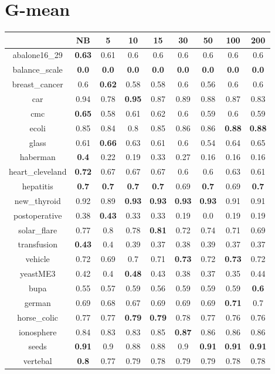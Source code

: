 \documentclass{article}%
\begin{document}
%
\section*{G{-}mean}%
\begin{tabular}{c|cccccccc}%
\hline%
&NB&5&10&15&30&50&100&200\\%
\hline%
abalone16\_29&\textbf{0.63}&0.61&0.6&0.6&0.6&0.6&0.6&0.6\\%
\hline%
balance\_scale&\textbf{0.0}&\textbf{0.0}&\textbf{0.0}&\textbf{0.0}&\textbf{0.0}&\textbf{0.0}&\textbf{0.0}&\textbf{0.0}\\%
\hline%
breast\_cancer&0.6&\textbf{0.62}&0.58&0.58&0.6&0.56&0.6&0.6\\%
\hline%
car&0.94&0.78&\textbf{0.95}&0.87&0.89&0.88&0.87&0.83\\%
\hline%
cmc&\textbf{0.65}&0.58&0.61&0.62&0.6&0.59&0.6&0.59\\%
\hline%
ecoli&0.85&0.84&0.8&0.85&0.86&0.86&\textbf{0.88}&\textbf{0.88}\\%
\hline%
glass&0.61&\textbf{0.66}&0.63&0.61&0.6&0.54&0.64&0.65\\%
\hline%
haberman&\textbf{0.4}&0.22&0.19&0.33&0.27&0.16&0.16&0.16\\%
\hline%
heart\_cleveland&\textbf{0.72}&0.67&0.67&0.67&0.6&0.6&0.63&0.61\\%
\hline%
hepatitis&\textbf{0.7}&\textbf{0.7}&\textbf{0.7}&\textbf{0.7}&0.69&\textbf{0.7}&0.69&\textbf{0.7}\\%
\hline%
new\_thyroid&0.92&0.89&\textbf{0.93}&\textbf{0.93}&\textbf{0.93}&\textbf{0.93}&0.91&0.91\\%
\hline%
postoperative&0.38&\textbf{0.43}&0.33&0.33&0.19&0.0&0.19&0.19\\%
\hline%
solar\_flare&0.77&0.8&0.78&\textbf{0.81}&0.72&0.74&0.71&0.69\\%
\hline%
transfusion&\textbf{0.43}&0.4&0.39&0.37&0.38&0.39&0.37&0.37\\%
\hline%
vehicle&0.72&0.69&0.7&0.71&\textbf{0.73}&0.72&\textbf{0.73}&0.72\\%
\hline%
yeastME3&0.42&0.4&\textbf{0.48}&0.43&0.38&0.37&0.35&0.44\\%
\hline%
bupa&0.55&0.57&0.59&0.56&0.59&0.59&0.59&\textbf{0.6}\\%
\hline%
german&0.69&0.68&0.67&0.69&0.69&0.69&\textbf{0.71}&0.7\\%
\hline%
horse\_colic&0.77&0.77&\textbf{0.79}&\textbf{0.79}&0.78&0.77&0.76&0.76\\%
\hline%
ionosphere&0.84&0.83&0.83&0.85&\textbf{0.87}&0.86&0.86&0.86\\%
\hline%
seeds&\textbf{0.91}&0.9&0.88&0.88&0.9&\textbf{0.91}&\textbf{0.91}&\textbf{0.91}\\%
\hline%
vertebal&\textbf{0.8}&0.77&0.79&0.78&0.79&0.79&0.78&0.78\\%
\hline%
\end{tabular}

%
\end{document}
